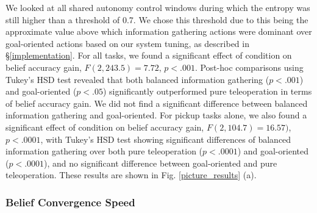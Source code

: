 \documentclass[conference]{IEEEtran}
\begin{document}

We looked at all shared autonomy control windows during which the entropy was still higher than a threshold of 0.7. We chose this threshold due to this being the approximate value above which information gathering actions were dominant over goal-oriented actions based on our system tuning, as described in \S\ref{implementation}. For all tasks, we found a significant effect of condition on belief accuracy gain, $F(2, 243.5) = 7.72$, $p < .001$. Post-hoc comparisons using Tukey's HSD test revealed that both balanced information gathering ($p < .001$) and goal-oriented ($p < .05$) significantly outperformed pure teleoperation in terms of belief accuracy gain. We did not find a significant difference between balanced information gathering and goal-oriented. For pickup tasks alone, we also found a significant effect of condition on belief accuracy gain, $F(2, 104.7) = 16.57)$, $p < .0001$, with Tukey's HSD test showing significant differences of balanced information gathering over both pure teleoperation ($p < .0001$) and goal-oriented ($p < .0001$),  and no significant difference between goal-oriented and pure teleoperation. These results are shown in Fig. \ref{picture_results} (a).

\subsubsection{Belief Convergence Speed}
\end{document}

